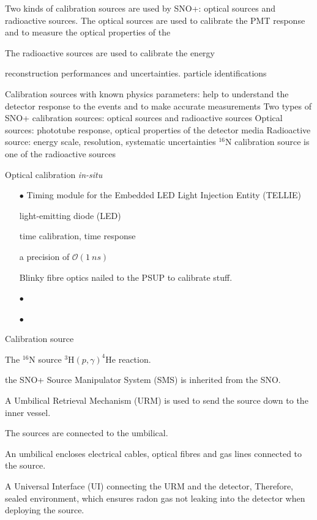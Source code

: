 Two kinds of calibration sources are used by SNO+: optical sources and radioactive sources. 
The optical sources are used to calibrate the PMT response and to measure the optical properties of the 


The radioactive sources are used to calibrate the energy 

reconstruction performances and uncertainties.
particle identifications



Calibration sources with known physics parameters: help to understand the detector response to the events and to make accurate measurements
Two types of SNO+ calibration sources: optical sources and radioactive sources Optical sources: phototube response, optical properties of the detector media Radioactive source: energy scale, resolution, systematic
uncertainties
$^{16}$N calibration source is one of the radioactive sources


Optical calibration  {\emph {in-situ}} 
\begin{itemize}  
	\item[$\bullet$] Timing module for the Embedded LED Light Injection Entity (TELLIE)
	
	light-emitting diode (LED)
	
	
	time calibration, time response 
	
	a precision of $\mathcal{O} (1~ns)$
	
	Blinky fibre optics nailed to the PSUP to calibrate stuff.
	
	
	
	\item[$\bullet$]  
	
	
	\item[$\bullet$] 
\end{itemize}


Calibration source

The $^{16}$N source
$^{3}$H$(p,\gamma)^{4}$He reaction.

the SNO+ Source Manipulator System (SMS)
is inherited from the SNO.

A Umbilical Retrieval Mechanism (URM) is used to send the source down to the inner vessel.

The sources are connected to the umbilical.

An umbilical encloses electrical cables, optical fibres and gas lines connected to the source.

A Universal Interface (UI) connecting the URM and the detector, 
Therefore, sealed environment, which 
ensures radon gas not leaking into the detector when deploying the source.

